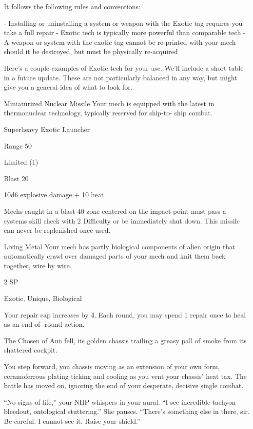  It follows the following rules and conventions:

    -    Installing or uninstalling a system or weapon with the Exotic tag requires you take a full
         repair
    -    Exotic tech is typically more powerful than comparable tech
    -    A weapon or system with the exotic tag cannot be re-printed with your mech should it
         be destroyed, but must be physically re-acquired

Here’s a couple examples of Exotic tech for your use. We’ll include a short table in a future
update. These are not particularly balanced in any way, but might give you a general idea of what
to look for.


Miniaturized Nuclear Missile
Your mech is equipped with the latest in thermonuclear technology, typically reserved for ship-to-
ship combat.

Superheavy Exotic Launcher

Range 50

Limited (1)

Blast 20

10d6 explosive damage + 10 heat


Mechs caught in a blast 40 zone centered on the impact point must pass a systems skill check
with 2 Difficulty or be immediately shut down. This missile can never be replenished once used.


Living Metal
Your mech has partly biological components of alien origin that automatically crawl over damaged
parts of your mech and knit them back together, wire by wire.




2 SP

Exotic, Unique, Biological

Your repair cap increases by 4. Each round, you may spend 1 repair once to heal as an end-of-
round action.


The Chosen of Aun fell, its golden chassis trailing a greasy pall of smoke from its shattered
cockpit.

You step forward, you chassis moving as an extension of your own form, ceramoferrous plating
ticking and cooling as you vent your chassis’ heat tax. The battle has moved on, ignoring the end
of your desperate, decisive single combat.

“No signs of life,” your NHP whispers in your aural. “I see incredible tachyon bleedout,
ontological stuttering.” She pauses. “There’s something else in there, sir. Be careful. I cannot see
it. Raise your shield.”

